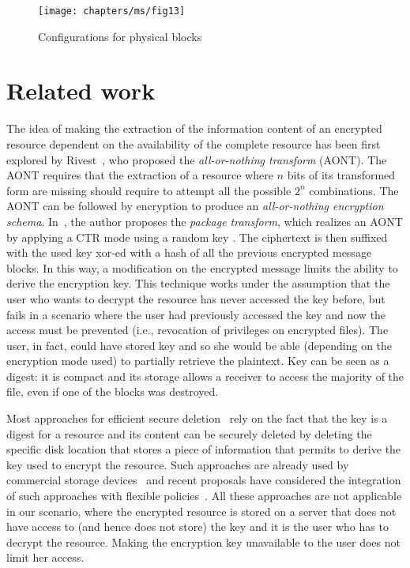 \begin{figure}[t]
\texttt{[image: chapters/ms/fig13]}
\caption{\label{ms:fig:physical}Configurations for physical blocks}
\end{figure}


\section{Related work}\label{ms:sec:relwork}

The idea of making the extraction of the information content of an encrypted resource dependent on the availability of the complete resource has been first explored by Rivest~\cite{r97}, who proposed the {\em all-or-nothing transform} (AONT). The AONT requires that the extraction of a resource where $n$ bits of its transformed form are missing should require to attempt all the possible $2^n$ combinations. The AONT can be followed by encryption to produce an {\em all-or-nothing encryption schema}. In~\cite{r97}, the author proposes the {\em package transform}, which realizes an AONT by applying a CTR mode using a random key \key{}. The ciphertext is then suffixed with the used key \key{} {\sc xor}-ed with a hash of all the previous encrypted message blocks. In this way, a modification on the encrypted message limits the ability to derive the encryption key. This technique works under the assumption that the user who wants to decrypt the resource has never accessed the key before, but fails in a scenario where the user had previously accessed the key and now the access must be prevented (i.e., revocation of privileges on encrypted files). The user, in fact, could have stored key \key{} and so she would be able (depending on the encryption mode used) to partially retrieve the plaintext. Key \key{} can be seen as a digest: it is compact and its storage allows a receiver to access the majority of the file, even if one of the blocks was destroyed.

Most approaches for efficient secure deletion~\cite{chhs13,dw10} rely on the fact that the key is a digest for a resource and its content can be securely deleted by deleting the specific disk location that stores a piece of information that permits to derive the key used to encrypt the resource. Such approaches are already used by commercial storage devices~\cite{standardInd} and recent proposals have considered the integration of such approaches with flexible policies~\cite{chhs13}. All these approaches are not applicable in our scenario, where the encrypted resource is stored on a server that does not have access to (and hence does not store) the key and it is the user who has to decrypt the resource. Making the encryption key unavailable to the user does not limit her access.

